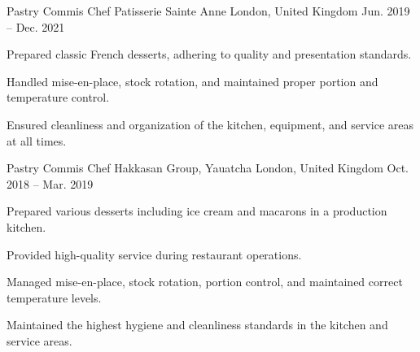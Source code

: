

\begin{cventries}

  \cventry
    {Pastry Commis Chef} %
    {Patisserie Sainte Anne} %
    {London, United Kingdom} %
    {Jun. 2019 -- Dec. 2021} %
    {
      \begin{cvitems} %
        \item {Prepared classic French desserts, adhering to quality and presentation standards.}
        \item {Handled mise-en-place, stock rotation, and maintained proper portion and temperature control.}
        \vfill\null
        \columnbreak
        \item {Ensured cleanliness and organization of the kitchen, equipment, and service areas at all times.}
      \end{cvitems}
    }

  \cventry
    {Pastry Commis Chef} %
    {Hakkasan Group, Yauatcha} %
    {London, United Kingdom} %
    {Oct. 2018 -- Mar. 2019} %
    {
      \begin{cvitems} %
        \item {Prepared various desserts including ice cream and macarons in a production kitchen.}
        \item {Provided high-quality service during restaurant operations.}
        \vfill\null
        \columnbreak
        \item {Managed mise-en-place, stock rotation, portion control, and maintained correct temperature levels.}
        \item {Maintained the highest hygiene and cleanliness standards in the kitchen and service areas.}
      \end{cvitems}
    }


\end{cventries}
